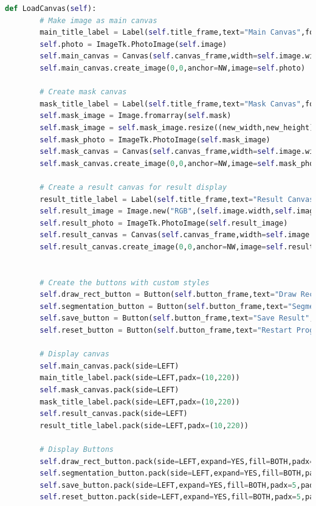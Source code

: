 \begin{lstlisting}[language=Python,basicstyle=\tiny]
    def LoadCanvas(self):    
        # Make image as main canvas
        main_title_label = Label(self.title_frame,text="Main Canvas",font=('Helvetica',10,'bold'))
        self.photo = ImageTk.PhotoImage(self.image)
        self.main_canvas = Canvas(self.canvas_frame,width=self.image.width,height=self.image.height)
        self.main_canvas.create_image(0,0,anchor=NW,image=self.photo)

        # Create mask canvas
        mask_title_label = Label(self.title_frame,text="Mask Canvas",font=('Helvetica',10,'bold'))
        self.mask_image = Image.fromarray(self.mask)
        self.mask_image = self.mask_image.resize((new_width,new_height)) # <-- untuk resize ukuran
        self.mask_photo = ImageTk.PhotoImage(self.mask_image)
        self.mask_canvas = Canvas(self.canvas_frame,width=self.image.width,height=self.image.height)
        self.mask_canvas.create_image(0,0,anchor=NW,image=self.mask_photo)

        # Create a result canvas for result display
        result_title_label = Label(self.title_frame,text="Result Canvas",font=('Helvetica',10,'bold'))
        self.result_image = Image.new("RGB",(self.image.width,self.image.height))
        self.result_photo = ImageTk.PhotoImage(self.result_image)
        self.result_canvas = Canvas(self.canvas_frame,width=self.image.width,height=self.image.height)
        self.result_canvas.create_image(0,0,anchor=NW,image=self.result_photo)

        
        # Create the buttons with custom styles
        self.draw_rect_button = Button(self.button_frame,text="Draw Rectangle",command=self.drawing_rectangle,bg='#4CAF50',fg='white',font=('Helvetica',10))
        self.segmentation_button = Button(self.button_frame,text="Segmentation Grabcut",command=self.segmentation_image,bg='#2196F3',fg='white',font=('Helvetica',10))
        self.save_button = Button(self.button_frame,text="Save Result",command=self.save_result_image,bg='#FFC107',fg='black',font=('Helvetica',10))
        self.reset_button = Button(self.button_frame,text="Restart Program",command=self.reset_image,bg='#607D8B',fg='white',font=('Helvetica',10))
        
        # Display canvas
        self.main_canvas.pack(side=LEFT)
        main_title_label.pack(side=LEFT,padx=(10,220))
        self.mask_canvas.pack(side=LEFT)
        mask_title_label.pack(side=LEFT,padx=(10,220))
        self.result_canvas.pack(side=LEFT)
        result_title_label.pack(side=LEFT,padx=(10,220))

        # Display Buttons
        self.draw_rect_button.pack(side=LEFT,expand=YES,fill=BOTH,padx=5,pady=(10,10))
        self.segmentation_button.pack(side=LEFT,expand=YES,fill=BOTH,padx=5,pady=(10,10))
        self.save_button.pack(side=LEFT,expand=YES,fill=BOTH,padx=5,pady=(10,10))        
        self.reset_button.pack(side=LEFT,expand=YES,fill=BOTH,padx=5,pady=(10,10))


\end{lstlisting}
